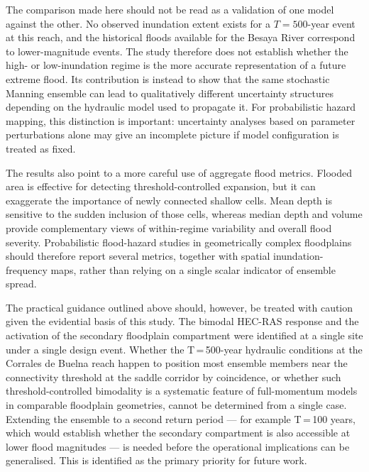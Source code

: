 \documentclass[a4paper,fleqn]{cas-sc}
\newcommand{\hecras}{\textsc{HEC-RAS}}
\begin{document}
The comparison made here should not be read as a validation of one model against the other. No observed inundation extent exists for a $T=500$-year event at this reach, and the historical floods available for the Besaya River correspond to lower-magnitude events. The study therefore does not establish whether the high- or low-inundation regime is the more accurate representation of a future extreme flood. Its contribution is instead to show that the same stochastic Manning ensemble can lead to qualitatively different uncertainty structures depending on the hydraulic model used to propagate it. For probabilistic hazard mapping, this distinction is important: uncertainty analyses based on parameter perturbations alone may give an incomplete picture if model configuration is treated as fixed.

The results also point to a more careful use of aggregate flood metrics. Flooded area is effective for detecting threshold-controlled expansion, but it can exaggerate the importance of newly connected shallow cells. Mean depth is sensitive to the sudden inclusion of those cells, whereas median depth and volume provide complementary views of within-regime variability and overall flood severity. Probabilistic flood-hazard studies in geometrically complex floodplains should therefore report several metrics, together with spatial inundation-frequency maps, rather than relying on a single scalar indicator of ensemble spread.

The practical guidance outlined above should, however, be treated with caution given the evidential basis of this study. The bimodal \hecras{} response and the activation of the secondary floodplain compartment were identified at a single site under a single design event. Whether the T\,=\,500-year hydraulic conditions at the Corrales de Buelna reach happen to position most ensemble members near the connectivity threshold at the saddle corridor by coincidence, or whether such threshold-controlled bimodality is a systematic feature of full-momentum models in comparable floodplain geometries, cannot be determined from a single case. Extending the ensemble to a second return period --- for example T\,=\,100 years, which would establish whether the secondary compartment is also accessible at lower flood magnitudes --- is needed before the operational implications can be generalised. This is identified as the primary priority for future work.
\end{document}
